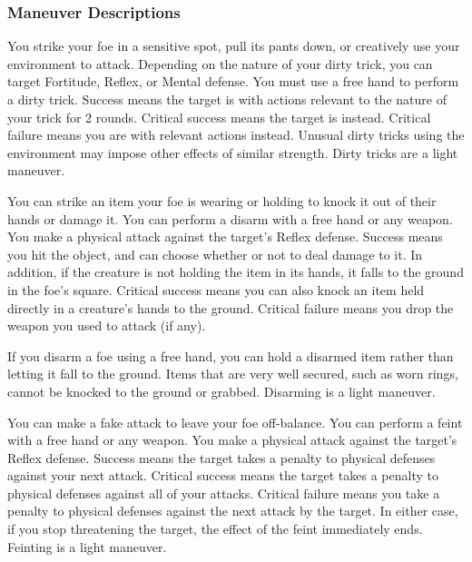         \subsubsection{Maneuver Descriptions}

            \label{Dirty Trick} You strike your foe in a sensitive spot, pull its pants down, or creatively use your environment to attack.
            Depending on the nature of your dirty trick, you can target Fortitude, Reflex, or Mental defense.
            You must use a free hand to perform a dirty trick.
            Success means the target is \impaired with actions relevant to the nature of your trick for 2 rounds.
            Critical success means the target is \severelyimpaired instead.
            Critical failure means you are \impaired with relevant actions instead.
            Unusual dirty tricks using the environment may impose other effects of similar strength.
            Dirty tricks are a light maneuver.

            \label{Disarm} You can strike an item your foe is wearing or holding to knock it out of their hands or damage it.
            You can perform a disarm with a free hand or any weapon.
            You make a physical attack against the target's Reflex defense.
            Success means you hit the object, and can choose whether or not to deal damage to it.
            In addition, if the creature is not holding the item in its hands, it falls to the ground in the foe's square.
            Critical success means you can also knock an item held directly in a creature's hands to the ground.
            Critical failure means you drop the weapon you used to attack (if any).

            If you disarm a foe using a free hand, you can hold a disarmed item rather than letting it fall to the ground.
            Items that are very well secured, such as worn rings, cannot be knocked to the ground or grabbed.
            Disarming is a light maneuver.

            \label{Feint} You can make a fake attack to leave your foe off-balance.
            You can perform a feint with a free hand or any weapon.
            You make a physical attack against the target's Reflex defense.
            Success means the target takes a  penalty to physical defenses against your next attack.
            Critical success means the target takes a  penalty to physical defenses against all of your attacks.
            Critical failure means you take a  penalty to physical defenses against the next attack by the target.
            In either case, if you stop threatening the target, the effect of the feint immediately ends.
            Feinting is a light maneuver.

